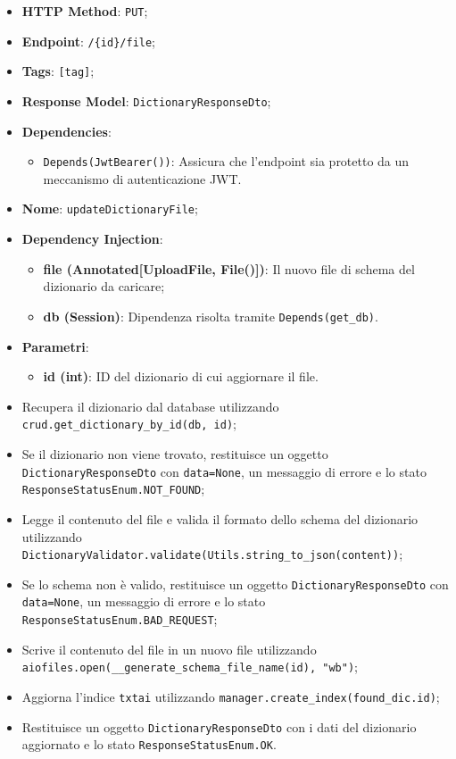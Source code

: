 \begin{itemize}
\item \textbf{HTTP Method}: \texttt{PUT};
\item \textbf{Endpoint}: \texttt{/\{id\}/file};
\item \textbf{Tags}: \texttt{[tag]};
\item \textbf{Response Model}: \texttt{DictionaryResponseDto};
\item \textbf{Dependencies}:
\begin{itemize}
\item \texttt{Depends(JwtBearer())}: Assicura che l'endpoint sia protetto da un meccanismo di autenticazione JWT.
\end{itemize}
\item \textbf{Nome}: \texttt{updateDictionaryFile};
\item \textbf{Dependency Injection}:
\begin{itemize}
\item \textbf{file (Annotated[UploadFile, File()])}: Il nuovo file di schema del dizionario da caricare;
\item \textbf{db (Session)}: Dipendenza risolta tramite \texttt{Depends(get\_db)}.
\end{itemize}
\item \textbf{Parametri}:
\begin{itemize}
\item \textbf{id (int)}: ID del dizionario di cui aggiornare il file.
\end{itemize}
\end{itemize}

\begin{itemize}
\item Recupera il dizionario dal database utilizzando \texttt{crud.get\_dictionary\_by\_id(db, id)};
\item Se il dizionario non viene trovato, restituisce un oggetto \texttt{DictionaryResponseDto} con \texttt{data=None}, un messaggio di errore e lo stato \texttt{ResponseStatusEnum.NOT\_FOUND};
\item Legge il contenuto del file e valida il formato dello schema del dizionario utilizzando \texttt{DictionaryValidator.validate(Utils.string\_to\_json(content))};
\item Se lo schema non è valido, restituisce un oggetto \texttt{DictionaryResponseDto} con \texttt{data=None}, un messaggio di errore e lo stato \texttt{ResponseStatusEnum.BAD\_REQUEST};
\item Scrive il contenuto del file in un nuovo file utilizzando \texttt{aiofiles.open(\_\_generate\_s\-chema\_file\_name(id), "wb")};
\item Aggiorna l'indice \texttt{txtai} utilizzando \texttt{manager.create\_index(found\_dic.id)};
\item Restituisce un oggetto \texttt{DictionaryResponseDto} con i dati del dizionario aggiornato e lo stato \texttt{ResponseStatusEnum.OK}.
\end{itemize}

